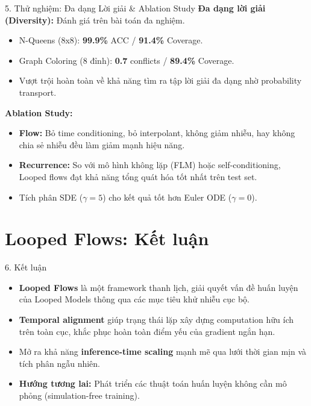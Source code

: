 \begin{frame}{5. Thử nghiệm: Đa dạng Lời giải \& Ablation Study}
    \textbf{Đa dạng lời giải (Diversity):} Đánh giá trên bài toán đa nghiệm.
    \begin{itemize}
        \item N-Queens (8x8): \textbf{99.9\%} ACC / \textbf{91.4\%} Coverage.
        \item Graph Coloring (8 đỉnh): \textbf{0.7} conflicts / \textbf{89.4\%} Coverage.
        \item Vượt trội hoàn toàn về khả năng tìm ra tập lời giải đa dạng nhờ probability transport.
    \end{itemize}
    
    \textbf{Ablation Study:}
    \begin{itemize}
        \item \textbf{Flow:} Bỏ time conditioning, bỏ interpolant, không giảm nhiễu, hay không chia sẻ nhiễu đều làm giảm mạnh hiệu năng.
        \item \textbf{Recurrence:} So với mô hình không lặp (FLM) hoặc self-conditioning, Looped flows đạt khả năng tổng quát hóa tốt nhất trên test set.
        \item Tích phân SDE ($\gamma=5$) cho kết quả tốt hơn Euler ODE ($\gamma=0$).
    \end{itemize}
\end{frame}

\section{Looped Flows: Kết luận}
\begin{frame}{6. Kết luận}
    \begin{itemize}
        \item \textbf{Looped Flows} là một framework thanh lịch, giải quyết vấn đề huấn luyện của Looped Models thông qua các mục tiêu khử nhiễu cục bộ.
        \item \textbf{Temporal alignment} giúp trạng thái lặp xây dựng computation hữu ích trên toàn cục, khắc phục hoàn toàn điểm yếu của gradient ngắn hạn.
        \item Mở ra khả năng \textbf{inference-time scaling} mạnh mẽ qua lưới thời gian mịn và tích phân ngẫu nhiên.
        \item \textbf{Hướng tương lai:} Phát triển các thuật toán huấn luyện không cần mô phỏng (simulation-free training).
    \end{itemize}
\end{frame}

